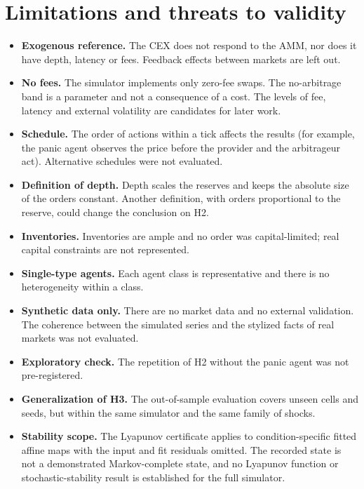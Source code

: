 \section{Limitations and threats to validity}

\begin{itemize}
  \item \textbf{Exogenous reference.} The CEX does not respond to the AMM, nor does it have depth, latency or fees. Feedback effects between markets are left out.
  \item \textbf{No fees.} The simulator implements only zero-fee swaps. The no-arbitrage band is a parameter and not a consequence of a cost. The levels of fee, latency and external volatility are candidates for later work.
  \item \textbf{Schedule.} The order of actions within a tick affects the results (for example, the panic agent observes the price before the provider and the arbitrageur act). Alternative schedules were not evaluated.
  \item \textbf{Definition of depth.} Depth scales the reserves and keeps the absolute size of the orders constant. Another definition, with orders proportional to the reserve, could change the conclusion on H2.
  \item \textbf{Inventories.} Inventories are ample and no order was capital-limited; real capital constraints are not represented.
  \item \textbf{Single-type agents.} Each agent class is representative and there is no heterogeneity within a class.
  \item \textbf{Synthetic data only.} There are no market data and no external validation. The coherence between the simulated series and the stylized facts of real markets was not evaluated.
  \item \textbf{Exploratory check.} The repetition of H2 without the panic agent was not pre-registered.
  \item \textbf{Generalization of H3.} The out-of-sample evaluation covers unseen cells and seeds, but within the same simulator and the same family of shocks.
  \item \textbf{Stability scope.} The Lyapunov certificate applies to condition-specific fitted affine maps with the input and fit residuals omitted. The recorded state is not a demonstrated Markov-complete state, and no Lyapunov function or stochastic-stability result is established for the full simulator.
\end{itemize}
